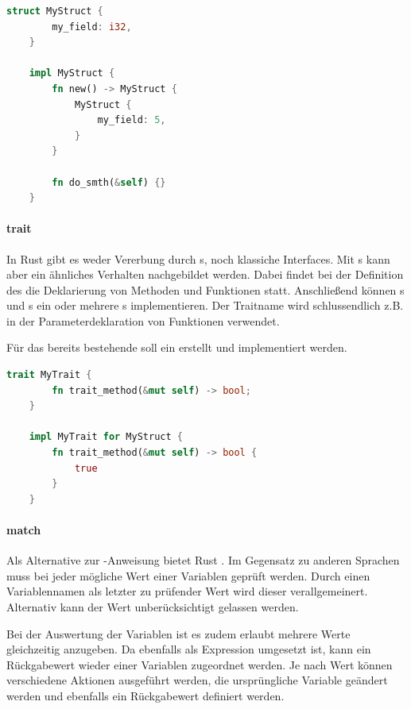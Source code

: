 \documentclass[11pt,a4paper, ngerman]{article}
\begin{document}
\begin{lstlisting}[language=rust, caption={struct}]
    struct MyStruct {
        my_field: i32,
    }

    impl MyStruct {
        fn new() -> MyStruct {
            MyStruct {
                my_field: 5,
            }
        }

        fn do_smth(&self) {}
    }
\end{lstlisting}
\paragraph{trait} In Rust gibt es weder Vererbung durch s, noch klassiche Interfaces. Mit s kann aber ein ähnliches Verhalten nachgebildet werden. Dabei findet bei der Definition des  die Deklarierung von Methoden und Funktionen statt. Anschließend können s und s ein oder mehrere s implementieren. Der Traitname wird schlussendlich z.B. in der Parameterdeklaration von Funktionen verwendet.

Für das bereits bestehende  soll ein  erstellt und implementiert werden.

\begin{lstlisting}[language=rust, caption={trait}]
    trait MyTrait {
        fn trait_method(&mut self) -> bool;
    }

    impl MyTrait for MyStruct {
        fn trait_method(&mut self) -> bool {
            true
        }
    }
\end{lstlisting}
\paragraph{match} Als Alternative zur -Anweisung bietet Rust . Im Gegensatz zu anderen Sprachen muss bei  jeder mögliche Wert einer Variablen geprüft werden. Durch einen Variablennamen als letzter zu prüfender Wert wird dieser verallgemeinert. Alternativ kann der Wert unberücksichtigt gelassen werden.

Bei der Auswertung der Variablen ist es zudem erlaubt mehrere Werte gleichzeitig anzugeben. Da  ebenfalls als Expression umgesetzt ist, kann ein Rückgabewert wieder einer Variablen zugeordnet werden. Je nach Wert können verschiedene Aktionen ausgeführt werden, die ursprüngliche Variable geändert werden und ebenfalls ein Rückgabewert definiert werden.
\end{document}
